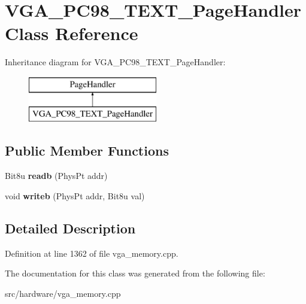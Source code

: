 \hypertarget{classVGA__PC98__TEXT__PageHandler}{\section{V\-G\-A\-\_\-\-P\-C98\-\_\-\-T\-E\-X\-T\-\_\-\-Page\-Handler Class Reference}
\label{classVGA__PC98__TEXT__PageHandler}
}
Inheritance diagram for V\-G\-A\-\_\-\-P\-C98\-\_\-\-T\-E\-X\-T\-\_\-\-Page\-Handler\-:\begin{figure}[H]
\begin{center}
\leavevmode
\includegraphics[height=2.000000cm]{classVGA__PC98__TEXT__PageHandler}
\end{center}
\end{figure}
\subsection*{Public Member Functions}
\begin{DoxyCompactItemize}
\item 
\hypertarget{classVGA__PC98__TEXT__PageHandler_a7313ad38bf12ab8ffd3707a513d7ff5d}{Bit8u {\bfseries readb} (Phys\-Pt addr)}\label{classVGA__PC98__TEXT__PageHandler_a7313ad38bf12ab8ffd3707a513d7ff5d}

\item 
\hypertarget{classVGA__PC98__TEXT__PageHandler_a1cd02680b1dd4c33aa48ac21a0476fbd}{void {\bfseries writeb} (Phys\-Pt addr, Bit8u val)}\label{classVGA__PC98__TEXT__PageHandler_a1cd02680b1dd4c33aa48ac21a0476fbd}

\end{DoxyCompactItemize}


\subsection{Detailed Description}


Definition at line 1362 of file vga\-\_\-memory.\-cpp.



The documentation for this class was generated from the following file\-:\begin{DoxyCompactItemize}
\item 
src/hardware/vga\-\_\-memory.\-cpp\end{DoxyCompactItemize}
